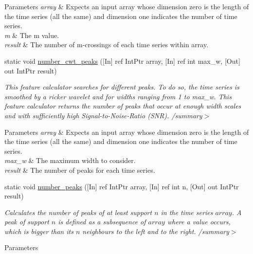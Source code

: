 \begin{DoxyCompactItemize}
\begin{DoxyCompactList}
\begin{DoxyParams}{Parameters}
{\em array} & Expects an input array whose dimension zero is the length of the time series (all the same) and dimension one indicates the number of time series.\\
\hline
{\em m} & The m value.\\
\hline
{\em result} & The number of m-\/crossings of each time series within array.\\
\hline
\end{DoxyParams}
\end{DoxyCompactList}\item 
static void \mbox{\hyperlink{classkhiva_1_1interop_1_1_d_l_l_features_abbeca07d57cd3fd6bdcfd7306f4ca34d}{number\+\_\+cwt\+\_\+peaks}} (\mbox{[}In\mbox{]} ref Int\+Ptr array, \mbox{[}In\mbox{]} ref int max\+\_\+w, \mbox{[}Out\mbox{]} out Int\+Ptr result)
\begin{DoxyCompactList}\small\item\em This feature calculator searches for different peaks. To do so, the time series is smoothed by a ricker wavelet and for widths ranging from 1 to max\+\_\+w. This feature calculator returns the number of peaks that occur at enough width scales and with sufficiently high Signal-\/to-\/\+Noise-\/\+Ratio (S\+NR). /summary$>$ 
\begin{DoxyParams}{Parameters}
{\em array} & Expects an input array whose dimension zero is the length of the time series (all the same) and dimension one indicates the number of time series.\\
\hline
{\em max\+\_\+w} & The maximum width to consider.\\
\hline
{\em result} & The number of peaks for each time series.\\
\hline
\end{DoxyParams}
\end{DoxyCompactList}\item 
static void \mbox{\hyperlink{classkhiva_1_1interop_1_1_d_l_l_features_a78341949bf960804409322fe39226fdf}{number\+\_\+peaks}} (\mbox{[}In\mbox{]} ref Int\+Ptr array, \mbox{[}In\mbox{]} ref int n, \mbox{[}Out\mbox{]} out Int\+Ptr result)
\begin{DoxyCompactList}\small\item\em Calculates the number of peaks of at least support $n$ in the time series $array$. A peak of support $n$ is defined as a subsequence of $array$ where a value occurs, which is bigger than its $n$ neighbours to the left and to the right. /summary$>$ 
\begin{DoxyParams}{Parameters}

\end{DoxyParams}
\end{DoxyCompactList}
\end{DoxyCompactItemize}
